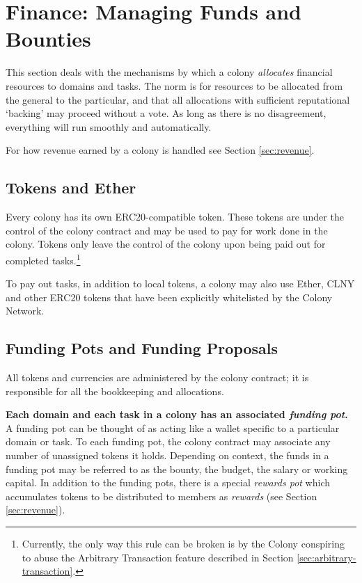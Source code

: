 

\section{Finance: Managing Funds and Bounties}\label{sec:finance}
This section deals with the mechanisms by which a colony \emph{allocates} financial resources to domains and tasks. The norm is for resources to be allocated from the general to the particular, and that all allocations with sufficient reputational `backing' may proceed without a vote. As long as there is no disagreement, everything will run smoothly and automatically.

For how revenue earned by a colony is handled see Section \ref{sec:revenue}.

\subsection{Tokens and Ether}
Every colony has its own ERC20-compatible token. These tokens are under the control of the colony contract and may be used to pay for work done in the colony. Tokens only leave the control of the colony upon being paid out for completed tasks.\footnote{Currently, the only way this rule can be broken is by the Colony conspiring to abuse the Arbitrary Transaction feature described in Section \ref{sec:arbitrary-transaction}. }

To pay out tasks, in addition to local tokens, a colony may also use Ether, CLNY and other ERC20 tokens that have been explicitly whitelisted by the Colony Network.


\subsection{Funding Pots and Funding Proposals}\label{sec:pots-and-fp}
All tokens and currencies are administered by the colony contract; it is responsible for all the bookkeeping and allocations.

\textbf{Each domain and each task in a colony has an associated \emph{funding pot}.} A funding pot can be thought of as acting like a wallet specific to a particular domain or task. To each funding pot, the colony contract may associate any number of unassigned tokens it holds. Depending on context, the funds in a funding pot may be referred to as the bounty, the budget, the salary or working capital. In addition to the funding pots, there is a special \emph{rewards pot} which accumulates tokens to be distributed to members as \textit{rewards} (see Section \ref{sec:revenue}).

